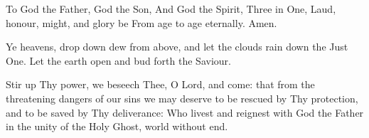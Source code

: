 {{{\item To God the Father, God the Son,
And God the Spirit, Three in One,
Laud, honour, might, and glory be
From age to age eternally.
Amen.}

{
\def\vrlinebreak{T}
\label{vr-rorate}
{Ye heavens, drop down dew from above, and let the clouds rain down the Just One.}
{Let the earth open and bud forth the Saviour.}
}
}

\bigskip
{
\def\anttranslation{Fear not, Mary, for thou hast found grace with the Lord: behold thou shalt conceive and bring forth a son, alleluia.}
\def\preverses{\greblockcustos}
}

{Stir up Thy power, we beseech Thee, O Lord, and come: that from the threatening dangers of our sins we may deserve to be rescued by Thy protection, and to be saved by Thy deliverance: Who livest and reignest with God the Father in the unity of the Holy Ghost, world without end.}

\bigskip
\benedicamusdomino{}
}














